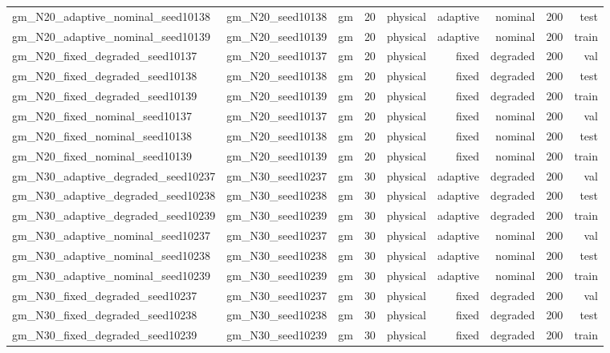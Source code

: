 \begin{tabular}{lrrrrrrrr}
gm\_N20\_adaptive\_nominal\_seed10138 & gm\_N20\_seed10138 & gm & 20 & physical & adaptive & nominal & 200 & test \\
gm\_N20\_adaptive\_nominal\_seed10139 & gm\_N20\_seed10139 & gm & 20 & physical & adaptive & nominal & 200 & train \\
gm\_N20\_fixed\_degraded\_seed10137 & gm\_N20\_seed10137 & gm & 20 & physical & fixed & degraded & 200 & val \\
gm\_N20\_fixed\_degraded\_seed10138 & gm\_N20\_seed10138 & gm & 20 & physical & fixed & degraded & 200 & test \\
gm\_N20\_fixed\_degraded\_seed10139 & gm\_N20\_seed10139 & gm & 20 & physical & fixed & degraded & 200 & train \\
gm\_N20\_fixed\_nominal\_seed10137 & gm\_N20\_seed10137 & gm & 20 & physical & fixed & nominal & 200 & val \\
gm\_N20\_fixed\_nominal\_seed10138 & gm\_N20\_seed10138 & gm & 20 & physical & fixed & nominal & 200 & test \\
gm\_N20\_fixed\_nominal\_seed10139 & gm\_N20\_seed10139 & gm & 20 & physical & fixed & nominal & 200 & train \\
gm\_N30\_adaptive\_degraded\_seed10237 & gm\_N30\_seed10237 & gm & 30 & physical & adaptive & degraded & 200 & val \\
gm\_N30\_adaptive\_degraded\_seed10238 & gm\_N30\_seed10238 & gm & 30 & physical & adaptive & degraded & 200 & test \\
gm\_N30\_adaptive\_degraded\_seed10239 & gm\_N30\_seed10239 & gm & 30 & physical & adaptive & degraded & 200 & train \\
gm\_N30\_adaptive\_nominal\_seed10237 & gm\_N30\_seed10237 & gm & 30 & physical & adaptive & nominal & 200 & val \\
gm\_N30\_adaptive\_nominal\_seed10238 & gm\_N30\_seed10238 & gm & 30 & physical & adaptive & nominal & 200 & test \\
gm\_N30\_adaptive\_nominal\_seed10239 & gm\_N30\_seed10239 & gm & 30 & physical & adaptive & nominal & 200 & train \\
gm\_N30\_fixed\_degraded\_seed10237 & gm\_N30\_seed10237 & gm & 30 & physical & fixed & degraded & 200 & val \\
gm\_N30\_fixed\_degraded\_seed10238 & gm\_N30\_seed10238 & gm & 30 & physical & fixed & degraded & 200 & test \\
gm\_N30\_fixed\_degraded\_seed10239 & gm\_N30\_seed10239 & gm & 30 & physical & fixed & degraded & 200 & train \\

\end{tabular}
